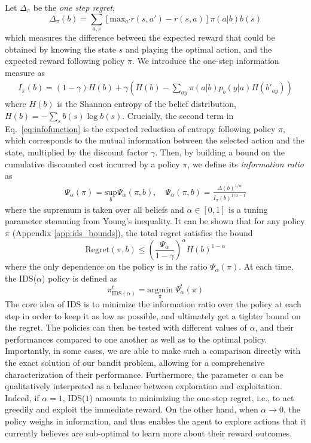 \documentclass[aps,nofootinbib,groupaddress,superscriptaddress,reprint,amsmath,amssymb,graphicx,onecolumn,prx]{revtex4-2}
\begin{document}
Let $\Delta_\pi$ be the \textit{one step regret},
\begin{equation}
    \Delta_\pi(b) =\sum_{a,s}\left[\text{max}_{a'} r(s,a')- r(s,a)\right]\pi(a|b) b(s)
\end{equation} 
which measures the difference between the expected reward that could be obtained by knowing the state $s$ and playing the optimal action, and the expected reward following policy $\pi$. We introduce the one-step information measure as
\begin{align}
    I_\pi(b)=(1-\gamma)H(b)+\gamma\left(H(b)-\sum_{ay}\pi(a|b)p_b(y|a) H(b'_{ay})\right)
    \label{eq:infofunction}
\end{align}
where $H(b)$ is the Shannon entropy of the belief distribution, $H(b)=-\sum_sb(s)\log b(s)$. Crucially, the second term in Eq.~\eqref{eq:infofunction} is the expected reduction of entropy following policy $\pi,$ which corresponds to the mutual information between the selected action and the state, multiplied by the discount factor $\gamma$. Then, by building a bound on the cumulative discounted cost incurred by a policy $\pi$, we define its \textit{information ratio} as
\begin{align}
    \Psi_\alpha(\pi)=\underset{b}{\text{sup}}\Psi_\alpha(\pi, b), \quad  \Psi_\alpha(\pi, b)=\frac{\Delta(b)^{1/\alpha}}{I_\pi(b) ^{1/\alpha-1}}
    \label{eq:inforatioalpha}
\end{align}
where the supremum is taken over all beliefs and $\alpha\in[0,1]$ is a tuning parameter stemming from Young's inequality. It can be shown that for any policy $\pi$ (Appendix \ref{app:ids_bounds}), the total regret satisfies the bound
\begin{equation}
    \text{Regret}(\pi,b)\leq\left(\frac{\Psi_\alpha}{1-\gamma} \right)^\alpha H(b)^{1-\alpha}
\end{equation}
where the only dependence on the policy is in the ratio  $\Psi_\alpha(\pi)$. At each time, the IDS($\alpha$) policy is defined as 
\begin{equation}
    \pi^t_{\mathrm{IDS}(\alpha)}=\underset{\pi}{\text{argmin}}\;\Psi_\alpha^t(\pi)
\end{equation}
The core idea of IDS is to minimize the information ratio over the policy at each step in order to keep it as low as possible, and ultimately get a tighter bound on the regret. The policies can then be tested with different values of $\alpha$, and their performances compared to one another as well as to the optimal policy. Importantly, in some cases, we are able to make such a comparison directly with the exact solution of our bandit problem, allowing for a comprehensive characterization of their performance. Furthermore, the parameter $\alpha$ can be qualitatively interpreted as a balance between exploration and exploitation. Indeed, if $\alpha = 1$, IDS($1$) amounts to minimizing the one-step regret, i.e., to act greedily and exploit the immediate reward. On the other hand, when $\alpha \to 0$, the policy weighs in information, and thus enables the agent to explore actions that it currently believes are sub-optimal to learn more about their reward outcomes.
\end{document}
